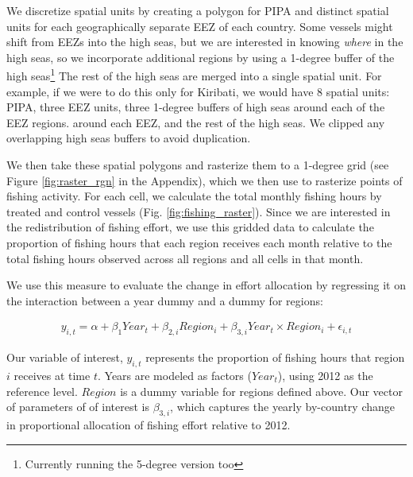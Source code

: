 \documentclass[9pt,twoside,lineno]{pnas-new}
\begin{document}
We discretize spatial units by creating a polygon for
PIPA and distinct
spatial units for each geographically separate EEZ of each country. Some vessels might shift
from EEZs into the high seas, but we are interested in knowing
\emph{where} in the high seas, so we incorporate additional regions by
using a 1-degree buffer of the high seas\footnote{Currently running the 5-degree version too}
The rest of the high seas are merged into a single spatial unit. For
example, if we were to do this only for Kiribati, we would have 8
spatial units: PIPA, three EEZ units, three 1-degree buffers of high seas  around each of the EEZ regions.
around each EEZ, and the rest of the high seas. We clipped any overlapping
high seas buffers to avoid duplication.

We then take these spatial polygons and rasterize them to a 1-degree grid
(see Figure \ref{fig:raster_rgn} in the Appendix), which we then use to rasterize points
of fishing activity. For each cell, we calculate the total monthly
fishing hours by treated and control vessels (Fig. \ref{fig:fishing_raster}).
Since we are interested in the redistribution
of fishing effort, we use this gridded data to calculate the proportion
of fishing hours that each region receives each month relative to the
total fishing hours observed across all regions and all cells in that
month.

We use this measure to evaluate the change in effort allocation by
regressing it on the interaction between a year dummy and a dummy for
regions:

\begin{figure}[h]
\begin{align*}
y_{i,t} = \alpha + \beta_1Year_t + \beta_{2,i}Region_i + \beta_{3,i}Year_t \times Region_i+ \epsilon_{i,t}
\end{align*}
\end{figure}


Our variable of interest, $y_{i,t}$ represents the proportion of
fishing hours that region $i$ receives at time $t$. Years are
modeled as factors ($Year_t$), using 2012 as the reference level.
$Region$ is a dummy variable for regions defined above. Our vector of parameters of
of interest is $\beta_{3,i}$, which captures the yearly by-country
change in proportional allocation of fishing effort relative to 2012.
\end{document}
